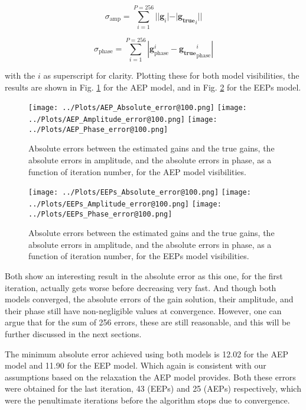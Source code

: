 \documentclass[12pt]{report} %
\begin{document}
\begin{equation}
    \sigma_{\text{amp}} = \sum_{i = 1}^{P = 256}||\mathbf{g}_{i}| - |\mathbf{g_{\text{true}}}_{i}||
\end{equation}

\begin{equation}
    \sigma_{\text{phase}} = \sum_{i = 1}^{P = 256}|\mathbf{g}^{i}_{\text{phase}} - \mathbf{g_{\text{true}}}^{i}_{\text{phase}}|
\end{equation}

with the $i$ as superscript for clarity. Plotting these for both model visibilities, the results are shown in Fig. \ref{fig:abs_error_AEP} for the AEP model, and in Fig. \ref{fig:abs_error_EEP} for the EEPs model.

\begin{figure}[h]
    \centering
    \texttt{[image: ../Plots/AEP\_Absolute\_error@100.png]}
    \texttt{[image: ../Plots/AEP\_Amplitude\_error@100.png]}
    \texttt{[image: ../Plots/AEP\_Phase\_error@100.png]}
    \caption{Absolute errors between the estimated gains and the true gains, the absolute errors in amplitude, and the absolute errors in phase, as a function of iteration number, for the AEP model visibilities.}
    \label{fig:abs_error_AEP}
\end{figure}

\begin{figure}[h]
  \centering
  \texttt{[image: ../Plots/EEPs\_Absolute\_error@100.png]}
  \texttt{[image: ../Plots/EEPs\_Amplitude\_error@100.png]}
  \texttt{[image: ../Plots/EEPs\_Phase\_error@100.png]}
  \caption{Absolute errors between the estimated gains and the true gains, the absolute errors in amplitude, and the absolute errors in phase, as a function of iteration number, for the EEPs model visibilities.}
  \label{fig:abs_error_EEP}
\end{figure}

Both show an interesting result in the absolute error as this one, for the first iteration, actually gets worse before decreasing very fast. And though both models converged, the absolute errors of the gain solution, their amplitude, and their phase still have non-negligible values at convergence. However, one can argue that for the sum of 256 errors, these are still reasonable, and this will be further discussed in the next sections.

The minimum absolute error achieved using both models is 12.02 for the AEP model and 11.90 for the EEP model. Which again is consistent with our assumptions based on the relaxation the AEP model provides. Both these errors were obtained for the last iteration, 43 (EEPs) and 25 (AEPs) respectively, which were the penultimate iterations before the algorithm stops due to convergence.
\end{document}
